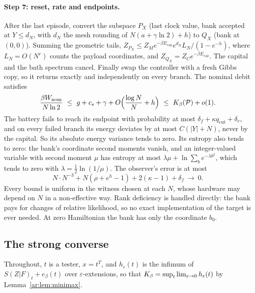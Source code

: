 \paragraph{Step 7: reset, rate and endpoints.} After the last episode, convert the subspace $P_X$ (last clock value, bank accepted at $Y\le d_N$, with $d_N$ the mesh rounding of $N(a+\gamma\ln2)+h$) to $Q_X$ (bank at $(0,0)$). Summing the geometric tails, $Z_{P_X}\le Z_Me^{-\beta E_{\mathrm{cap}}}e^{d_N}L_N/(1-e^{-h})$, where $L_N=O(N^r)$ counts the payload coordinates, and $Z_{Q_X}=Z_Ce^{-\beta E_{\mathrm{cap}}}$. The capital and the bath spectrum cancel. Finally swap the controller with a fresh Gibbs copy, so it returns exactly and independently on every branch. The nominal debit satisfies
\[
\frac{\beta W_{\mathrm{nom}}}{N\ln2}\ \le\ g+c_s+\gamma+O\Bigl(\frac{\log N}N+h\Bigr)\ \le\ \Kb(\Pp)+o(1).
\]
The battery fails to reach its endpoint with probability at most $\delta_f+\kappa q_{\mathrm{cut}}+\delta_r$, and on every failed branch its energy deviates by at most $C(|Y|+N)$, never by the capital. So its absolute energy variance tends to zero. Its entropy also tends to zero: the bank's coordinate second moments vanish, and an integer-valued variable with second moment $\mu$ has entropy at most $\lambda\mu+\ln\sum_be^{-\lambda b^2}$, which tends to zero with $\lambda=\frac12\ln(1/\mu)$. The observer's error is at most
\[
N\cdot N^{-3}+N(\rho+e^h-1)+2(\kappa-1)+\delta_f\ \to\ 0.
\]
Every bound is uniform in the witness chosen at each $N$, whose hardware may depend on $N$ in a non-effective way. Rank deficiency is handled directly: the bank pays for changes of relative likelihood, so no exact implementation of the target is ever needed. At zero Hamiltonian the bank has only the coordinate $b_0$.

\subsection{The strong converse}\label{ar:app:converse}

Throughout, $t$ is a tester, $x=t^T$, and $h_\varepsilon(t)$ is the infimum of $S(Z|F)_t+e_\beta(t)$ over $\varepsilon$-extensions, so that $K_\beta=\sup_t\lim_{\varepsilon\to0}h_\varepsilon(t)$ by Lemma~\ref{ar:lem:minimax}.

